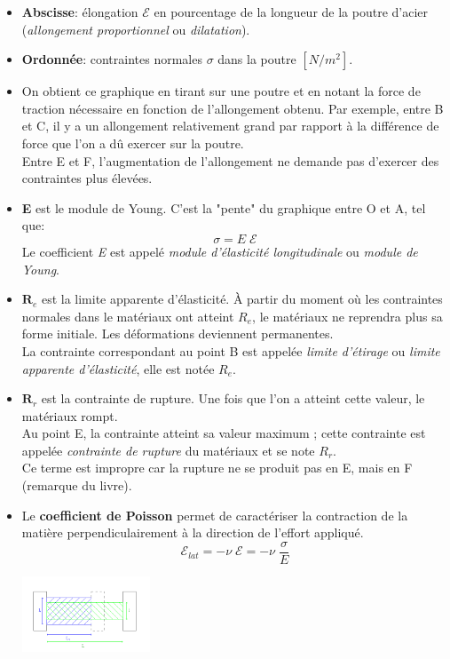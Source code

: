 \documentclass[a4paper]{article}
\begin{document}
\begin{itemize}

\item \textbf{Abscisse}: élongation $ \mathcal{E} $ en pourcentage de la longueur de la poutre d'acier (\emph{allongement proportionnel} ou \emph{dilatation}).

\item \textbf{Ordonnée}: contraintes normales $ \sigma $ dans la poutre $ [N/m^2] $.

\item On obtient ce graphique en tirant sur une poutre et en notant la force de traction nécessaire en fonction de l'allongement obtenu. Par exemple, entre B et C, il y a un allongement relativement grand par rapport à la différence de force que l'on a dû exercer sur la poutre. \\
Entre E et F, l'augmentation de l'allongement ne demande pas d'exercer des contraintes plus élevées.

\item \textbf{E} est le module de Young. C'est la "pente" du graphique entre O et A, tel que: 
\[ \sigma = E \; \mathcal{E} \]
Le coefficient \emph{E} est appelé \emph{module d'élasticité longitudinale} ou \emph{module de Young}.

\item $ \textbf{R}_e $ est la limite apparente d'élasticité. À partir du moment où les contraintes normales dans le matériaux ont atteint $ R_e $, le matériaux ne reprendra plus sa forme initiale. Les déformations deviennent permanentes. \\
La contrainte correspondant au point B est appelée \emph{limite d'étirage} ou \emph{limite apparente d'élasticité}, elle est notée $ R_e $.

\item $ \textbf{R}_r $ est la contrainte de rupture. Une fois que l'on a atteint cette valeur, le matériaux rompt. \\
Au point E, la contrainte atteint sa valeur maximum ; cette contrainte est appelée \emph{contrainte de rupture} du matériaux et se note $ R_r $. \\
Ce terme est impropre car la rupture ne se produit pas en E, mais en F (remarque du livre).

\item Le \textbf{coefficient de Poisson} permet de caractériser la contraction de la matière perpendiculairement à la direction de l'effort appliqué.
\[ \mathcal{E}_{lat} = - \nu \; \mathcal{E} = - \nu \; \frac{\sigma}{E} \]

\begin{center}
\includegraphics[width=0.3\textwidth]{images/Illustration_pour_coefficient_de_Poisson.png}
\end{center}

\end{itemize}
\end{document}
